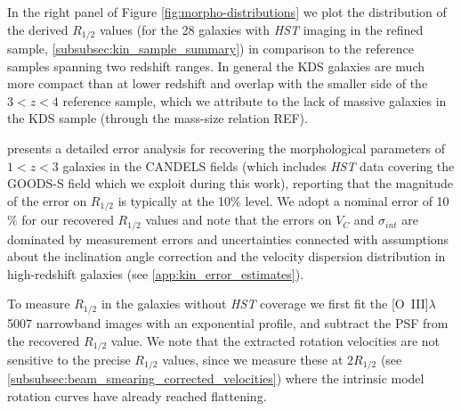 \documentclass[fleqn,usenatbib]{mn2e}
\begin{document}
In the right panel of Figure \ref{fig:morpho-distributions} we plot the distribution of the derived $R_{1/2}$ values (for the 28 galaxies with {\em HST} imaging in the refined sample, \cref{subsubsec:kin_sample_summary}) in comparison to the reference samples spanning two redshift ranges.
In general the KDS galaxies are much more compact than at lower redshift and overlap with the smaller side of the $3 < z < 4$ reference sample, which we attribute to the lack of massive galaxies in the KDS sample (through the mass-size relation REF).

\cite{Bruce2012} presents a detailed error analysis for recovering the morphological parameters of $1 < z < 3$ galaxies in the CANDELS fields (which includes {\em HST} data covering the GOODS-S field which we exploit during this work), reporting that the magnitude of the error on $R_{1/2}$ is typically at the 10$\%$ level.
We adopt a nominal error of 10$\%$ for our recovered $R_{1/2}$ values and note that the errors on $V_{C}$ and $\sigma_{int}$ are dominated by measurement errors and uncertainties connected with assumptions about the inclination angle correction and the velocity dispersion distribution in high-redshift galaxies (see \cref{app:kin_error_estimates}).

To measure $R_{1/2}$ in the galaxies without {\em HST} coverage we first fit the [O~{\sc III}]$\lambda$5007 narrowband images with an exponential profile, and subtract the PSF from the recovered $R_{1/2}$ value.
We note that the extracted rotation velocities are not sensitive to the precise $R_{1/2}$ values, since we measure these at $2R_{1/2}$ (see \cref{subsubsec:beam_smearing_corrected_velocities}) where the intrinsic model rotation curves have already reached flattening. \\
\end{document}
